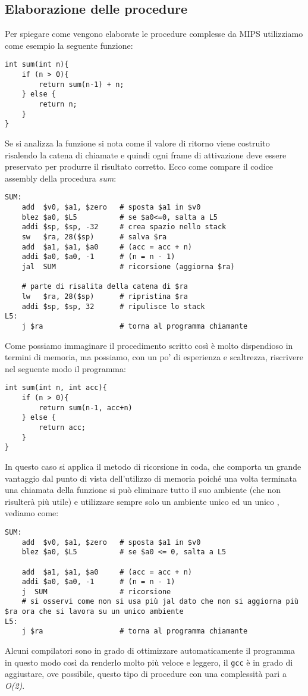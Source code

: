 \subsection{Elaborazione delle procedure}
Per spiegare come vengono elaborate le procedure complesse da MIPS utilizziamo come esempio la seguente funzione:

\begin{verbatim}
int sum(int n){
	if (n > 0){
		return sum(n-1) + n;
	} else {
		return n;
	}
}
\end{verbatim}

Se si analizza la funzione si nota come il valore di ritorno viene costruito risalendo la catena di chiamate e quindi ogni frame di attivazione deve essere preservato per produrre il risultato corretto. Ecco come compare il codice assembly della procedura \emph{sum}:

\begin{verbatim}
SUM:
	add  $v0, $a1, $zero   # sposta $a1 in $v0
	blez $a0, $L5          # se $a0<=0, salta a L5
	addi $sp, $sp, -32     # crea spazio nello stack
	sw   $ra, 28($sp)      # salva $ra
	add  $a1, $a1, $a0     # (acc = acc + n)
	addi $a0, $a0, -1      # (n = n - 1)
	jal  SUM               # ricorsione (aggiorna $ra)

	# parte di risalita della catena di $ra
	lw   $ra, 28($sp)      # ripristina $ra
	addi $sp, $sp, 32      # ripulisce lo stack
L5:
	j $ra                  # torna al programma chiamante
\end{verbatim}

Come possiamo immaginare il procedimento scritto così è  molto dispendioso in termini di memoria, ma possiamo, con un po' di esperienza e scaltrezza, riscrivere nel seguente modo il programma:

\begin{verbatim}
int sum(int n, int acc){
	if (n > 0){
		return sum(n-1, acc+n)
	} else {
		return acc;
	}
}
\end{verbatim}

In questo caso si applica il metodo di ricorsione in coda, che comporta un grande vantaggio dal punto di vista dell'utilizzo di memoria poiché una volta terminata una chiamata della funzione si può eliminare tutto il suo ambiente (che non risulterà più utile) e utilizzare sempre solo un ambiente unico ed un unico , vediamo come:

\begin{verbatim}
SUM:
	add  $v0, $a1, $zero   # sposta $a1 in $v0
	blez $a0, $L5          # se $a0 <= 0, salta a L5

	add  $a1, $a1, $a0     # (acc = acc + n)
	addi $a0, $a0, -1      # (n = n - 1)
	j  SUM                 # ricorsione
	# si osservi come non si usa più jal dato che non si aggiorna più $ra ora che si lavora su un unico ambiente
L5:
	j $ra                  # torna al programma chiamante
\end{verbatim}
Alcuni compilatori sono in grado di ottimizzare automaticamente il programma in questo modo così da renderlo molto più veloce e leggero, il \texttt{gcc} è in grado di aggiustare, ove possibile, questo tipo di procedure con una complessità pari a \emph{O(2)}.

